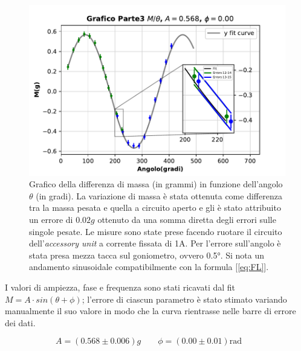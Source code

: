 {\fontsize{12}{14}\selectfont 

\begin{figure}[H]
  \centering
  \includegraphics[width=15cm]{Figures/GraficoMthetaParte3.pdf}
  \caption{Grafico della differenza di massa (in grammi) in funzione dell'angolo $\theta$ (in gradi). La variazione di massa è stata ottenuta come differenza tra la massa pesata e quella a circuito aperto e gli è stato attribuito un errore di $0.02g$ ottenuto da una somma diretta degli errori sulle singole pesate. Le misure sono state prese facendo ruotare il circuito dell'\emph{accessory unit} a corrente fissata di 1A. Per l'errore sull'angolo è stata presa mezza tacca sul goniometro, ovvero 0.5°.
  Si nota un andamento sinusoidale compatibilmente con la formula [\ref{eq:FL}].}   
  \label{fig:GraficoParteIII}
\end{figure}
I valori di ampiezza, fase e frequenza sono stati ricavati dal fit $M = A \cdot sin(\theta + \phi)$; l'errore di ciascun parametro è stato stimato variando manualmente il suo valore in modo che la curva rientrasse nelle barre di errore dei dati.

\begin{equation*}
    A = (0.568 \pm 0.006) g \qquad \phi = (0.00 \pm 0.01) \text{rad} \qquad %
\end{equation*}

\par}